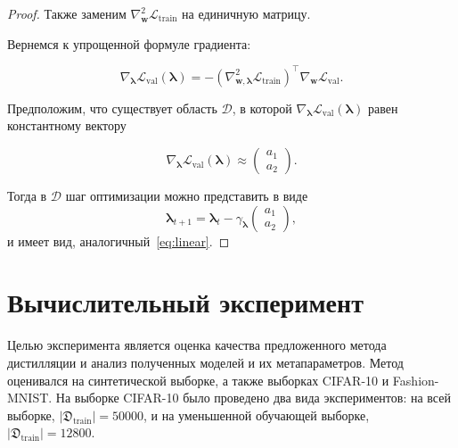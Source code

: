 \documentclass[12pt]{a&t}
\begin{document}
\begin{proof}
Также заменим $\nabla_{\textbf{w}}^2 \mathcal{L}_\text{train}$ на единичную матрицу.

Вернемся к упрощенной формуле градиента:

$$\nabla_{\boldsymbol{\lambda}}\mathcal{L}_\text{val}(\boldsymbol{\lambda}) = - (\nabla_{\textbf{w}, \boldsymbol{\lambda}}^2\mathcal{L}_\text{train})^\top\nabla_{\textbf{w}}\mathcal{L}_\text{val}.$$

Предположим, что существует область $\mathcal{D}$, в которой $\nabla_{\boldsymbol{\lambda}}\mathcal{L}_\text{val}(\boldsymbol{\lambda})$ равен константному вектору

\[\nabla_{\boldsymbol{\lambda}}\mathcal{L}_\text{val}(\boldsymbol{\lambda}) \approx \begin{pmatrix} a_1\\ a_2\end{pmatrix}.\]

Тогда в $\mathcal{D}$ шаг оптимизации можно представить в виде
$$
    \boldsymbol{\lambda}_{t+1} = \boldsymbol{\lambda}_{t} - \gamma_{\boldsymbol{\lambda}}\begin{pmatrix} a_1\\ a_2\end{pmatrix},
$$
\noindent
и имеет вид, аналогичный~\eqref{eq:linear}.
\end{proof}



\section{Вычислительный эксперимент}

Целью эксперимента является оценка качества предложенного метода дистилляции и анализ полученных моделей и их метапараметров. Метод оценивался на синтетической выборке, а также выборках CIFAR-10 и Fashion-MNIST.%
На выборке CIFAR-10 было проведено два вида экспериментов: на всей выборке, $|\mathfrak{D}_\text{train}|=50000$, и на уменьшенной обучающей выборке, $|\mathfrak{D}_\text{train}|=12800$. 
\end{document}
